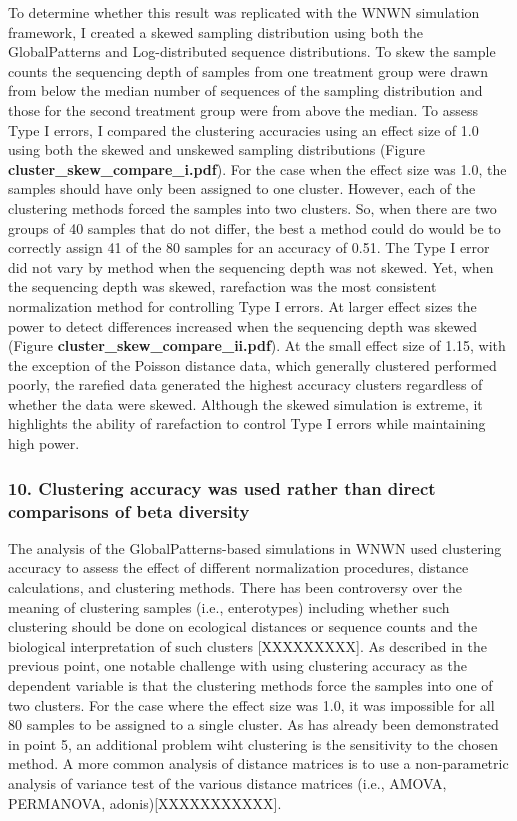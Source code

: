 \documentclass[
]{article}
\begin{document}
To determine whether this result was replicated with the WNWN simulation
framework, I created a skewed sampling distribution using both the
GlobalPatterns and Log-distributed sequence distributions. To skew the
sample counts the sequencing depth of samples from one treatment group
were drawn from below the median number of sequences of the sampling
distribution and those for the second treatment group were from above
the median. To assess Type I errors, I compared the clustering
accuracies using an effect size of 1.0 using both the skewed and
unskewed sampling distributions (Figure
\textbf{cluster\_skew\_compare\_i.pdf}). For the case when the effect
size was 1.0, the samples should have only been assigned to one cluster.
However, each of the clustering methods forced the samples into two
clusters. So, when there are two groups of 40 samples that do not
differ, the best a method could do would be to correctly assign 41 of
the 80 samples for an accuracy of 0.51. The Type I error did not vary by
method when the sequencing depth was not skewed. Yet, when the
sequencing depth was skewed, rarefaction was the most consistent
normalization method for controlling Type I errors. At larger effect
sizes the power to detect differences increased when the sequencing
depth was skewed (Figure \textbf{cluster\_skew\_compare\_ii.pdf}). At
the small effect size of 1.15, with the exception of the Poisson
distance data, which generally clustered performed poorly, the rarefied
data generated the highest accuracy clusters regardless of whether the
data were skewed. Although the skewed simulation is extreme, it
highlights the ability of rarefaction to control Type I errors while
maintaining high power.

\hypertarget{clustering-accuracy-was-used-rather-than-direct-comparisons-of-beta-diversity}{%
\subsubsection{10. Clustering accuracy was used rather than direct
comparisons of beta
diversity}\label{clustering-accuracy-was-used-rather-than-direct-comparisons-of-beta-diversity}}

The analysis of the GlobalPatterns-based simulations in WNWN used
clustering accuracy to assess the effect of different normalization
procedures, distance calculations, and clustering methods. There has
been controversy over the meaning of clustering samples (i.e.,
enterotypes) including whether such clustering should be done on
ecological distances or sequence counts and the biological
interpretation of such clusters {[}XXXXXXXXX{]}. As described in the
previous point, one notable challenge with using clustering accuracy as
the dependent variable is that the clustering methods force the samples
into one of two clusters. For the case where the effect size was 1.0, it
was impossible for all 80 samples to be assigned to a single cluster. As
has already been demonstrated in point 5, an additional problem wiht
clustering is the sensitivity to the chosen method. A more common
analysis of distance matrices is to use a non-parametric analysis of
variance test of the various distance matrices (i.e., AMOVA, PERMANOVA,
adonis){[}XXXXXXXXXXX{]}.
\end{document}
